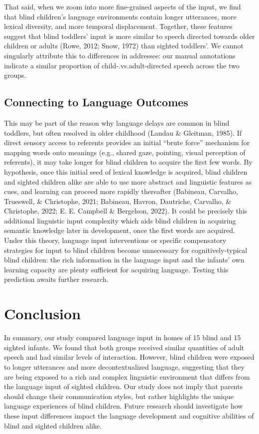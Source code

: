\documentclass[
  man]{apa6}
\begin{document}
That said, when we zoom into more fine-grained aspects of the input, we find that blind children's language environments contain longer utterances, more lexical diversity, and more temporal displacement. Together, these features suggest that blind toddlers' input is more similar to speech directed towards older children or adults (Rowe, 2012; Snow, 1972) than sighted toddlers'. We cannot singularly attribute this to differences in addressee: our manual annotations indicate a similar proportion of child-.vs.adult-directed speech across the two groups.

\hypertarget{connecting-to-language-outcomes}{%
\subsection{Connecting to Language Outcomes}\label{connecting-to-language-outcomes}}

This may be part of the reason why language delays are common in blind toddlers, but often resolved in older childhood (Landau \& Gleitman, 1985). If direct sensory access to referents provides an initial ``brute force'' mechanism for mapping words onto meanings (e.g., shared gaze, pointing, visual perception of referents), it may take longer for blind children to acquire the first few words. By hypothesis, once this initial seed of lexical knowledge is acquired, blind children and sighted children alike are able to use more abstract and linguistic features as cues, and learning can proceed more rapidly thereafter (Babineau, Carvalho, Trueswell, \& Christophe, 2021; Babineau, Havron, Dautriche, Carvalho, \& Christophe, 2022; E. E. Campbell \& Bergelson, 2022). It could be precisely this additional linguistic input complexity which aids blind children in acquiring semantic knowledge later in development, once the first words are acquired. Under this theory, language input interventions or specific compensatory strategies for input to blind children become unnecessary for cognitively-typical blind children: the rich information in the language input and the infants' own learning capacity are plenty sufficient for acquiring language. Testing this prediction awaits further research.

\hypertarget{conclusion}{%
\section{Conclusion}\label{conclusion}}

In summary, our study compared language input in homes of 15 blind and 15 sighted infants. We found that both groups received similar quantities of adult speech and had similar levels of interaction. However, blind children were exposed to longer utterances and more decontextualized language, suggesting that they are being exposed to a rich and complex linguistic environment that differs from the language input of sighted children. Our study does not imply that parents should change their communication styles, but rather highlights the unique language experiences of blind children. Future research should investigate how these input differences impact the language development and cognitive abilities of blind and sighted children alike.
\end{document}
